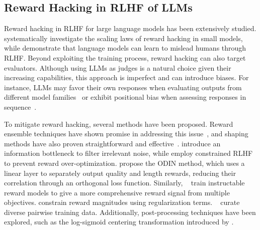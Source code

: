 \subsection{Reward Hacking in RLHF of LLMs}  
Reward hacking in RLHF for large language models has been extensively studied. \citet{gao2023scaling} systematically investigate the scaling laws of reward hacking in small models, while \citet{wen2024languagemodelslearnmislead} demonstrate that language models can learn to mislead humans through RLHF. Beyond exploiting the training process, reward hacking can also target evaluators. Although using LLMs as judges is a natural choice given their increasing capabilities, this approach is imperfect and can introduce biases. For instance, LLMs may favor their own responses when evaluating outputs from different model families~\cite{liu2024llmsnarcissisticevaluatorsego} or exhibit positional bias when assessing responses in sequence~\cite{wang2023largelanguagemodelsfair}.  

To mitigate reward hacking, several methods have been proposed. Reward ensemble techniques have shown promise in addressing this issue~\cite{Eisenstein2023HelpingOH, Rame2024WARMOT, ahmed2024scalableensemblingmitigatingreward, coste2023reward, zhang2024improvingreinforcementlearninghuman}, and shaping methods have also proven straightforward and effective~\cite{yang2024regularizinghiddenstatesenables, jinnai2024regularizedbestofnsamplingmitigate}. \citet{miao2024informmitigatingrewardhacking} introduce an information bottleneck to filter irrelevant noise, while \citet{moskovitz2023confrontingrewardmodeloveroptimization} employ constrained RLHF to prevent reward over-optimization. \citet{Chen2024ODINDR} propose the ODIN method, which uses a linear layer to separately output quality and length rewards, reducing their correlation through an orthogonal loss function. Similarly,
~\citet{sun2023salmon} train instructable reward models to give a more comprehensive reward signal from multiple objectives. \citet{Dai2023SafeRS} constrain reward magnitudes using regularization terms. ~\citet{liu2024rrmrobustrewardmodel} curate diverse pairwise training data. Additionally, post-processing techniques have been explored, such as the log-sigmoid centering transformation introduced by \citet{Wang2024TransformingAC}.  

